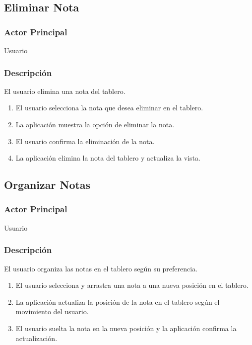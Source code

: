 \subsection{Eliminar Nota}
\subsubsection{Actor Principal}
Usuario

\subsubsection{Descripción}
El usuario elimina una nota del tablero.

\begin{enumerate}
  \item El usuario selecciona la nota que desea eliminar en el tablero.
  \item La aplicación muestra la opción de eliminar la nota.
  \item El usuario confirma la eliminación de la nota.
  \item La aplicación elimina la nota del tablero y actualiza la vista.
\end{enumerate}

\subsection{Organizar Notas}
\subsubsection{Actor Principal}
Usuario

\subsubsection{Descripción}
El usuario organiza las notas en el tablero según su preferencia.

\begin{enumerate}
  \item El usuario selecciona y arrastra una nota a una nueva posición en el tablero.
  \item La aplicación actualiza la posición de la nota en el tablero según el movimiento del usuario.
  \item El usuario suelta la nota en la nueva posición y la aplicación confirma la actualización.
\end{enumerate}


